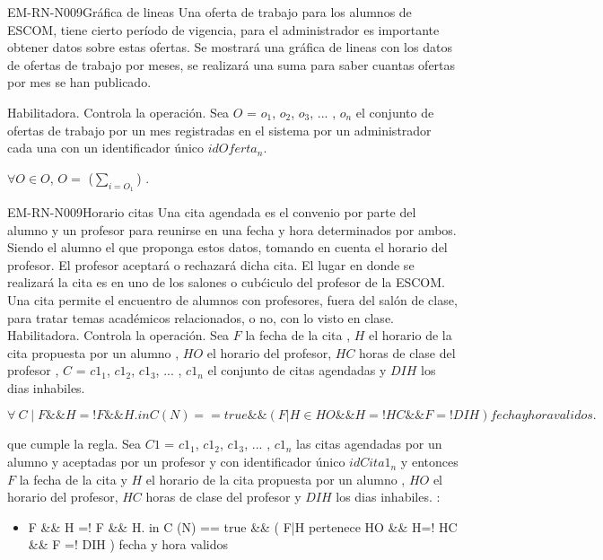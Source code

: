 \begin{BussinesRule}{EM-RN-N009}{Gráfica de lineas}
	\BRitem[Descripción:] 
	Una oferta de trabajo para los alumnos de ESCOM, tiene cierto período de vigencia, para el administrador es importante obtener datos sobre estas ofertas.
	Se mostrará una gráfica de lineas con los datos de ofertas de trabajo por meses, se realizará una suma para saber cuantas ofertas por mes se han publicado.
	
	\BRitem[Tipo:] Habilitadora.
	\BRitem[Nivel:] Controla la operación.
	\BRitem[Sentencia: ] Sea $O$ = {$o_{1}$, $o_{2}$, $o_{3}$, ... , $o_{n}$} el conjunto de ofertas de trabajo por un mes registradas en el sistema por un administrador cada una con un 
	identificador único $idOferta_{n}$.
	\begin{center}
		$\forall O \in O$, $O=$ {($ \sum_{i=O_1} $)} .
	\end{center}
\end{BussinesRule}

\begin{BussinesRule}{EM-RN-N009}{Horario citas}
	\BRitem[Descripción:] Una cita agendada es el convenio por parte del alumno y un profesor para reunirse
	en una fecha y hora determinados por ambos. Siendo el alumno el que proponga estos datos, tomando
	en cuenta el horario del profesor. El profesor aceptará o rechazará dicha cita.
	El lugar en donde se realizará la cita es en uno de los salones o cubćiculo del profesor de la ESCOM.
	Una cita permite el encuentro de alumnos con profesores, fuera del salón de clase, para tratar temas
	académicos relacionados, o no, con lo visto en clase.
	\BRitem[Tipo:] Habilitadora.
	\BRitem[Nivel:] Controla la operación.
	\BRitem[Sentencia: ] Sea $F$ la fecha de la cita , $H$ el horario de la cita propuesta por un alumno , $HO$ el horario del profesor, $HC$ horas de clase del profesor , $C$ = {$c1_{1}$, $c1_{2}$, $c1_{3}$, ... , $c1_{n}$} el conjunto de citas agendadas y $DIH$ los dias inhabiles.
	\begin{center}
		$\forall \: C \mid F \&\& H =! F \&\& H. in C (N) == true \&\& (F|H \in HO \&\& H=! HC \&\& F =! DIH ) fecha y hora validos.$

	\end{center}
	 que cumple la regla.
		Sea $C1$ = {$c1_{1}$, $c1_{2}$, $c1_{3}$, ... , $c1_{n}$} las citas agendadas por un alumno y
		aceptadas por un profesor y con identificador único $idCita1_{n}$ y  entonces $F$ la fecha de la cita y $H$ el horario de la cita propuesta por un alumno , $HO$ el horario del profesor, $HC$ horas de clase del profesor y $DIH$ los dias inhabiles. :
		\begin{itemize}
			\item  F \&\& H =! F \&\& H. in C (N) == true \&\& (
		F|H pertenece HO \&\& H=! HC \&\& F =! DIH ) fecha y hora validos
		\end{itemize}
\end{BussinesRule}

